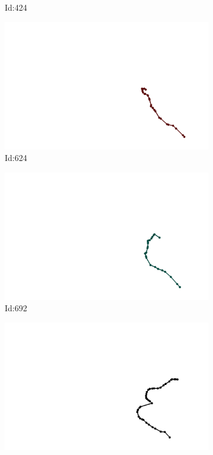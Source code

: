 \documentclass[12pt,twoside]{report}
\begin{document}
\begin{figure}
\begin{subfigure}[b]{0.20\textwidth}
\caption{Id:424}
\end{subfigure}
\begin{subfigure}[b]{0.20\textwidth}
\centering
\includegraphics[width=\textwidth]{../../trajectories/624.png}
\caption{Id:624}
\end{subfigure}
\begin{subfigure}[b]{0.20\textwidth}
\centering
\includegraphics[width=\textwidth]{../../trajectories/692.png}
\caption{Id:692}
\end{subfigure}
\begin{subfigure}[b]{0.20\textwidth}
\centering
\includegraphics[width=\textwidth]{../../trajectories/801.png}

\end{subfigure}
\end{figure}
\end{document}
